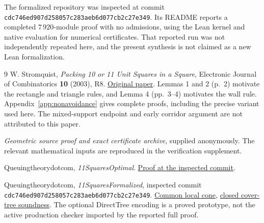 \documentclass[11pt]{article}
\begin{document}
The formalized repository was inspected at commit
\texttt{cdc746ed907d258057c283aeb6d077cb2c27e349}.
Its README reports a completed $7\,920$-module proof with no admissions,
using the Lean kernel and native evaluation for numerical certificates.
That reported run was not independently repeated here, and the present
synthesis is not claimed as a new Lean formalization.

\begin{thebibliography}{9}
W. Stromquist, \emph{Packing 10 or 11 Unit Squares in a Square},
Electronic Journal of Combinatorics \textbf{10} (2003), R8.
\href{https://www.combinatorics.org/ojs/index.php/eljc/article/download/v10i1r8/pdf}{Original paper}.
Lemmas 1 and 2 (p.~2) motivate the rectangle and triangle rules, and
Lemma 4 (pp.~3--4) motivates the wall rule. Appendix~\ref{app:nonavoidance}
gives complete proofs, including the precise variant used here.
The mixed-support endpoint and early corridor argument are not attributed
to this paper.

\emph{Geometric source proof and exact certificate archive}, supplied
anonymously. The relevant mathematical inputs are reproduced in the
verification supplement.

Queuingtheorydotcom, \emph{11SquaresOptimal}.
\href{https://github.com/Queuingtheorydotcom/11SquaresOptimal/blob/f9e0de713a0949d1bc6a0fa6b59d96edf6c3d65c/PROOF.md}{Proof at the inspected commit}.

Queuingtheorydotcom, \emph{11SquaresFormalized}, inspected commit
\texttt{cdc746ed907d258057c283aeb6d077cb2c27e349}.
\href{https://github.com/Queuingtheorydotcom/11SquaresFormalized/tree/cdc746ed907d258057c283aeb6d077cb2c27e349/ElevenSquare/Simplified}{Common local cone},
\href{https://github.com/Queuingtheorydotcom/11SquaresFormalized/blob/cdc746ed907d258057c283aeb6d077cb2c27e349/ElevenSquare/Tasks/T07/Ext/Check.lean}{closed cover-tree soundness}.
The optional DirectTree encoding is a proved prototype, not the active
production checker imported by the reported full proof.

\end{thebibliography}
\end{document}
